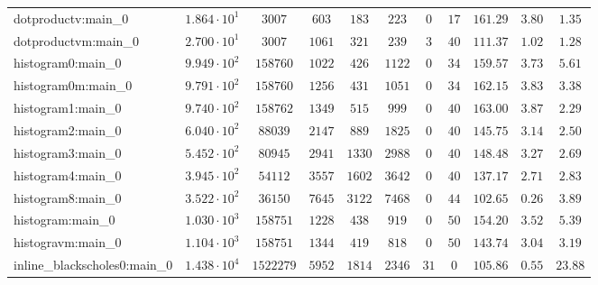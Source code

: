 \begin{tabular}{|l|c|c|c|c|c|c|c|c|c|c|}
dotproductv:main\_0            & $ 1.864 \cdot 10^{1} $ & $ 3007     $ & $ 603    $ & $ 183    $ & $ 223    $ & $ 0    $ & $ 17   $ & $ 161.29      $ & $ 3.80    $ & $ 1.35    $ \\
dotproductvm:main\_0           & $ 2.700 \cdot 10^{1} $ & $ 3007     $ & $ 1061   $ & $ 321    $ & $ 239    $ & $ 3    $ & $ 40   $ & $ 111.37      $ & $ 1.02    $ & $ 1.28    $ \\
histogram0:main\_0             & $ 9.949 \cdot 10^{2} $ & $ 158760   $ & $ 1022   $ & $ 426    $ & $ 1122   $ & $ 0    $ & $ 34   $ & $ 159.57      $ & $ 3.73    $ & $ 5.61    $ \\
histogram0m:main\_0            & $ 9.791 \cdot 10^{2} $ & $ 158760   $ & $ 1256   $ & $ 431    $ & $ 1051   $ & $ 0    $ & $ 34   $ & $ 162.15      $ & $ 3.83    $ & $ 3.38    $ \\
histogram1:main\_0             & $ 9.740 \cdot 10^{2} $ & $ 158762   $ & $ 1349   $ & $ 515    $ & $ 999    $ & $ 0    $ & $ 40   $ & $ 163.00      $ & $ 3.87    $ & $ 2.29    $ \\
histogram2:main\_0             & $ 6.040 \cdot 10^{2} $ & $ 88039    $ & $ 2147   $ & $ 889    $ & $ 1825   $ & $ 0    $ & $ 40   $ & $ 145.75      $ & $ 3.14    $ & $ 2.50    $ \\
histogram3:main\_0             & $ 5.452 \cdot 10^{2} $ & $ 80945    $ & $ 2941   $ & $ 1330   $ & $ 2988   $ & $ 0    $ & $ 40   $ & $ 148.48      $ & $ 3.27    $ & $ 2.69    $ \\
histogram4:main\_0             & $ 3.945 \cdot 10^{2} $ & $ 54112    $ & $ 3557   $ & $ 1602   $ & $ 3642   $ & $ 0    $ & $ 40   $ & $ 137.17      $ & $ 2.71    $ & $ 2.83    $ \\
histogram8:main\_0             & $ 3.522 \cdot 10^{2} $ & $ 36150    $ & $ 7645   $ & $ 3122   $ & $ 7468   $ & $ 0    $ & $ 44   $ & $ 102.65      $ & $ 0.26    $ & $ 3.89    $ \\
histogram:main\_0              & $ 1.030 \cdot 10^{3} $ & $ 158751   $ & $ 1228   $ & $ 438    $ & $ 919    $ & $ 0    $ & $ 50   $ & $ 154.20      $ & $ 3.52    $ & $ 5.39    $ \\
histogravm:main\_0             & $ 1.104 \cdot 10^{3} $ & $ 158751   $ & $ 1344   $ & $ 419    $ & $ 818    $ & $ 0    $ & $ 50   $ & $ 143.74      $ & $ 3.04    $ & $ 3.19    $ \\
inline\_blackscholes0:main\_0  & $ 1.438 \cdot 10^{4} $ & $ 1522279  $ & $ 5952   $ & $ 1814   $ & $ 2346   $ & $ 31   $ & $ 0    $ & $ 105.86      $ & $ 0.55    $ & $ 23.88   $ \\

\end{tabular}
